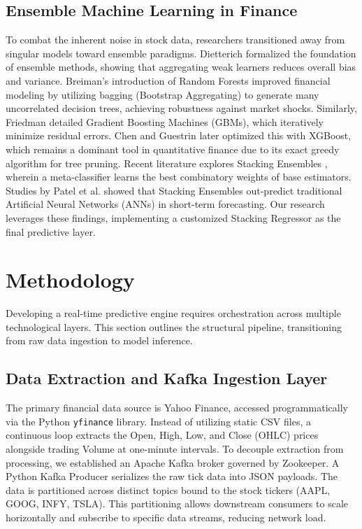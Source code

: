 \documentclass[conference]{IEEEtran}
\begin{document}
\subsection{Ensemble Machine Learning in Finance}
To combat the inherent noise in stock data, researchers transitioned away from singular models toward ensemble paradigms. Dietterich \cite{ref12} formalized the foundation of ensemble methods, showing that aggregating weak learners reduces overall bias and variance. 
Breiman's \cite{ref14} introduction of Random Forests improved financial modeling by utilizing bagging (Bootstrap Aggregating) to generate many uncorrelated decision trees, achieving robustness against market shocks. Similarly, Friedman \cite{ref15} detailed Gradient Boosting Machines (GBMs), which iteratively minimize residual errors. Chen and Guestrin \cite{ref16} later optimized this with XGBoost, which remains a dominant tool in quantitative finance due to its exact greedy algorithm for tree pruning. 
Recent literature explores Stacking Ensembles \cite{ref17}, wherein a meta-classifier learns the best combinatory weights of base estimators. Studies by Patel et al. \cite{ref13} showed that Stacking Ensembles out-predict traditional Artificial Neural Networks (ANNs) in short-term forecasting. Our research leverages these findings, implementing a customized Stacking Regressor as the final predictive layer.

\section{Methodology}
Developing a real-time predictive engine requires orchestration across multiple technological layers. This section outlines the structural pipeline, transitioning from raw data ingestion to model inference.

\subsection{Data Extraction and Kafka Ingestion Layer}
The primary financial data source is Yahoo Finance, accessed programmatically via the Python \texttt{yfinance} library. Instead of utilizing static CSV files, a continuous loop extracts the Open, High, Low, and Close (OHLC) prices alongside trading Volume at one-minute intervals. 
To decouple extraction from processing, we established an Apache Kafka broker governed by Zookeeper. A Python Kafka Producer serializes the raw tick data into JSON payloads. The data is partitioned across distinct topics bound to the stock tickers (AAPL, GOOG, INFY, TSLA). This partitioning allows downstream consumers to scale horizontally and subscribe to specific data streams, reducing network load.
\end{document}
